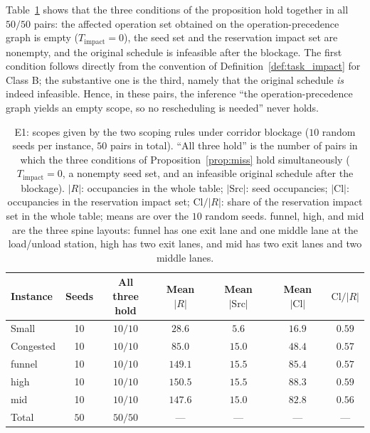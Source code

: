 \documentclass[manuscript,screen,review]{acmart}
\newcommand{\NSeeds}{10}
\newcommand{\NPairs}{50}
\newcommand{\PassMiss}{\NPairs/\NPairs}      %
\begin{document}
Table~\ref{tab:e1} shows that the three conditions of the proposition hold together in all \(\PassMiss\) pairs:
the affected operation set obtained on the operation-precedence graph is empty (\(T_{\mathrm{impact}}=0\)), the seed set and the reservation impact set are nonempty,
and the original schedule is infeasible after the blockage.
The first condition follows directly from the convention of Definition~\ref{def:task_impact} for Class B; the substantive one is the third, namely that the original schedule \emph{is} indeed infeasible.
Hence, in these pairs, the inference ``the operation-precedence graph yields an empty scope, so no rescheduling is needed'' never holds.

\begin{table}[t]
\centering
\caption{E1: scopes given by the two scoping rules under corridor blockage (\(\NSeeds\) random seeds per instance, \(\NPairs\) pairs in total).
``All three hold'' is the number of pairs in which the three conditions of Proposition~\ref{prop:miss} hold simultaneously (\(T_{\mathrm{impact}}=0\),
a nonempty seed set, and an infeasible original schedule after the blockage). \(|R|\): occupancies in the whole table; \(|\mathrm{Src}|\): seed occupancies;
\(|\mathrm{Cl}|\): occupancies in the reservation impact set; \(\mathrm{Cl}/|R|\): share of the reservation impact set in the whole table; means are over the \(\NSeeds\) random seeds.
funnel, high, and mid are the three spine layouts: funnel has one exit lane and one middle lane at the load/unload station, high has two exit lanes, and mid has two exit lanes and two middle lanes.}
\label{tab:e1}
\small
\begin{tabular}{@{}lcccccc@{}}
\toprule
Instance & Seeds & \makecell{All three\\hold} & Mean \(|R|\) & Mean \(|\mathrm{Src}|\)
 & Mean \(|\mathrm{Cl}|\) & \(\mathrm{Cl}/|R|\) \\
\midrule
Small      & 10 & \(10/10\) & \(28.6\)  & \(5.6\)  & \(16.9\) & \(0.59\) \\
Congested  & 10 & \(10/10\) & \(85.0\)  & \(15.0\) & \(48.4\) & \(0.57\) \\
funnel  & 10 & \(10/10\) & \(149.1\) & \(15.5\) & \(85.4\) & \(0.57\) \\
high    & 10 & \(10/10\) & \(150.5\) & \(15.5\) & \(88.3\) & \(0.59\) \\
mid     & 10 & \(10/10\) & \(147.6\) & \(15.0\) & \(82.8\) & \(0.56\) \\
\midrule
Total & \(\NPairs\) & \(\PassMiss\) & --- & --- & --- & --- \\
\bottomrule
\end{tabular}
\end{table}
\end{document}
